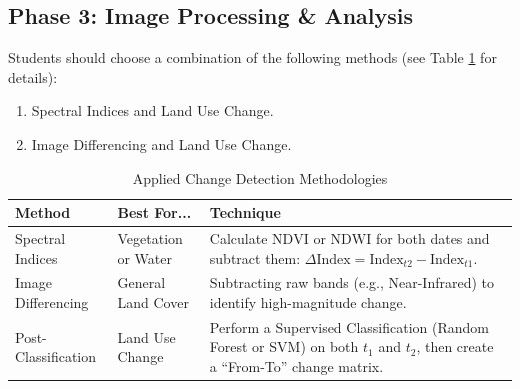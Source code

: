 \documentclass{article}
\begin{document}
\subsection*{Phase 3: Image Processing \& Analysis}
Students should choose a combination of the following methods (see Table \ref{tab:techniques} for details):

\begin{enumerate}
  \item Spectral Indices and Land Use Change.
  \item Image Differencing and Land Use Change.
\end{enumerate}


\begin{table}[!ht]
    \centering
    \caption{Applied Change Detection Methodologies}
    \label{tab:techniques}
    \small
    \begin{tabular}{l p{3.5cm} p{6.5cm}}
        \toprule
            \textbf{Method} & \textbf{Best For...} & \textbf{Technique} \\
        \midrule
            Spectral Indices & Vegetation or Water & Calculate $\text{NDVI}$ or $\text{NDWI}$ for both dates and subtract them: $\Delta \text{Index} = \text{Index}_{t2} - \text{Index}_{t1}$. \\ \addlinespace
            Image Differencing & General Land Cover & Subtracting raw bands (e.g., Near-Infrared) to identify high-magnitude change. \\ \addlinespace
            Post-Classification & Land Use Change & Perform a Supervised Classification (Random Forest or SVM) on both $t_1$ and $t_2$, then create a ``From-To'' change matrix. \\
        \bottomrule
    \end{tabular}
\end{table}
\end{document}
